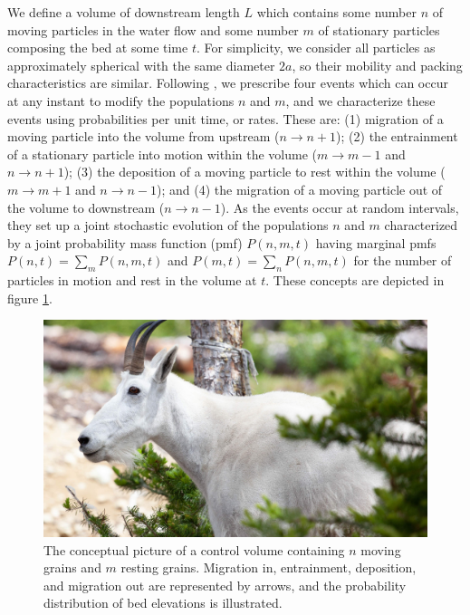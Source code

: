 \documentclass[draft]{agujournal2018}
\begin{document}
We define a volume of downstream length $L$ which contains some number $n$ of moving particles in the water flow and some number $m$ of stationary particles composing the bed at some time $t$.
For simplicity, we consider all particles as approximately spherical with the same diameter $2a$, so their mobility and packing characteristics are similar.
Following \citet{Ancey2008}, we prescribe four events which can occur at any instant to modify the populations $n$ and $m$, and we characterize these events using probabilities per unit time, or rates.
These are: (1) migration of a moving particle into the volume from upstream ($n \rightarrow n+1$); (2) the entrainment of a stationary particle into motion within the volume ($m\rightarrow m-1$ and $n\rightarrow n+1$); (3) the deposition of a moving particle to rest within the volume ($m\rightarrow m+1$ and $n\rightarrow n-1$); and (4) the migration of a moving particle out of the volume to downstream ($n\rightarrow n-1$).
As the events occur at random intervals, they set up a joint stochastic evolution of the populations $n$ and $m$ characterized by a joint probability mass function (pmf) $P(n,m,t)$ having marginal pmfs $P(n,t) = \sum_m P(n,m,t)$ and $P(m,t) = \sum_n P(n,m,t)$ for the number of particles in motion and rest in the volume at $t$.
These concepts are depicted in figure \ref{fig:concept}.
\begin{figure}
  \includegraphics[width=\linewidth,keepaspectratio]{rectdummy}
  \caption{The conceptual picture of a control volume containing $n$ moving grains and $m$ resting grains. Migration in, entrainment, deposition, and migration out are represented by arrows, and the probability distribution of bed elevations is illustrated.}
  \label{fig:concept}
\vspace{-1.0cm}
\end{figure}
\end{document}
